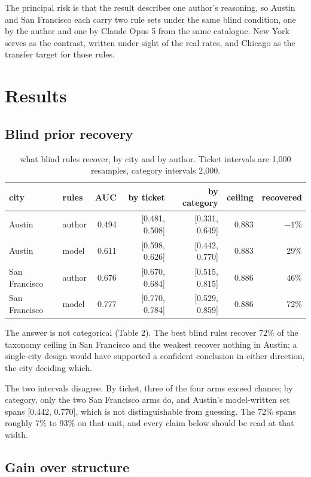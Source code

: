 \documentclass[10pt,a4paper,twocolumn]{article}
\begin{document}
The principal risk is that the result describes one author's reasoning, so
Austin and San Francisco each carry two rule sets under the same blind
condition, one by the author and one by Claude Opus 5 from the same
catalogue. New York serves as the contrast, written under sight of the real
rates, and Chicago as the transfer target for those rules.

\section*{Results}

\subsection*{Blind prior recovery}

\begin{table}[t]
\centering
\footnotesize
\begin{tabular}{llrrrrr}
\toprule
city & rules & AUC & by ticket & by category & ceiling & recovered \\
\midrule
Austin & author & 0.494 & [0.481, 0.508] & [0.331, 0.649] & 0.883 & $-1\%$ \\
Austin & model & 0.611 & [0.598, 0.626] & [0.442, 0.770] & 0.883 & 29\% \\
San Francisco & author & 0.676 & [0.670, 0.684] & [0.515, 0.815] & 0.886 & 46\% \\
San Francisco & model & 0.777 & [0.770, 0.784] & [0.529, 0.859] & 0.886 & 72\% \\
\bottomrule
\end{tabular}
\caption{what blind rules recover, by city and by author. Ticket intervals are 1,000 resamples, category intervals 2,000.}
\end{table}

The answer is not categorical (Table 2). The best blind rules recover 72\% of the
taxonomy ceiling in San Francisco and the weakest recover nothing in Austin; a
single-city design would have supported a confident conclusion in either
direction, the city deciding which.

The two intervals disagree. By ticket, three of the four arms exceed chance; by
category, only the two San Francisco arms do, and Austin's model-written set
spans [0.442, 0.770], which is not distinguishable from guessing. The 72\% spans
roughly 7\% to 93\% on that unit, and every claim below should be read at that
width.

\subsection*{Gain over structure}
\end{document}
